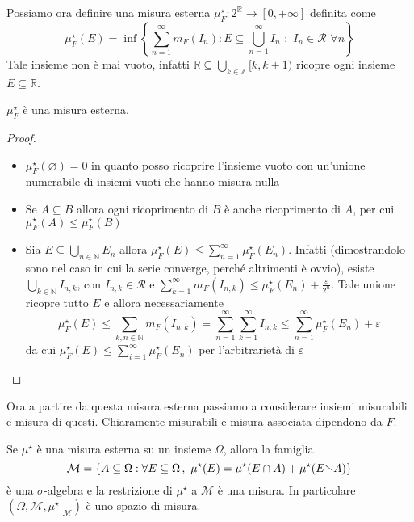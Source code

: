 Possiamo ora definire una misura esterna \(\mu^\star_F : 2^{\mathbb{R}} \to [0,
+\infty]\) definita come
\[
    \mu^\star_F{(E)} = \inf \left\{ \sum_{n=1}^{\infty} m_F{(I_{n})} : E
    \subseteq \bigcup_{n=1}^{\infty} I_{n} \,\,;\,\, I_{n} \in \mathcal{R}
\,\,\forall n \right\} 
\]
Tale insieme non è mai vuoto, infatti \(\mathbb{R} \subseteq \bigcup_{k \in
\mathbb{Z}} [k, k+1) \) ricopre ogni insieme \(E \subseteq \mathbb{R} \).
\begin{proposition}
    \(\mu^\star_F\) è una misura esterna.
\end{proposition}
\begin{proof}
\begin{itemize}[label = --]
    \item \(\mu^\star_F{(\varnothing)} = 0\) in quanto posso ricoprire l'insieme
        vuoto con un'unione numerabile di insiemi vuoti che hanno misura nulla
    \item  Se \(A \subseteq B \) allora ogni ricoprimento di \(B\) è anche
        ricoprimento di \(A\), per cui \(\mu^\star_F{(A)} \le \mu^\star_F{(B)}\)
    \item Sia \(E \subseteq \bigcup_{n \in \mathbb{N}} E_{n} \) allora
        \(\mu^\star_F{(E)} \le \sum_{n=1}^{\infty} \mu^\star_F{(E_{n})} \).
        Infatti (dimostrandolo sono nel caso in cui la serie converge, perché
        altrimenti è ovvio), esiste \(\bigcup_{k \in \mathbb{N}} I_{n, k} \),
        con \(I_{n, k}  \in \mathcal{R}\) e \(\sum_{k=1}^{\infty} m_F{(I_{n, k}
        )} \le \mu^\star_F{(E_{n})} + \frac{\varepsilon}{2^{n}}\). Tale unione
        ricopre tutto \(E\) e allora necessariamente
        \[
            \mu^\star_F{(E)} \le \sum_{k, n \in \mathbb{N}} m_F{(I_{n, k})} =
            \sum_{n=1}^{\infty} \sum_{k=1}^{\infty} I_{n, k} \le
            \sum_{n=1}^{\infty}  \mu^\star_F{(E_{n})} + \varepsilon
        \]
        da cui \(\mu^\star_F{(E)} \le \sum_{i=1}^{\infty} \mu^\star_F{(E_n)} \)
        per l'arbitrarietà di \(\varepsilon\) 
\end{itemize}
\end{proof}
Ora a partire da questa misura esterna passiamo a considerare insiemi misurabili
e misura di questi. Chiaramente misurabili e misura associata dipendono da
\(F\). 
\begin{theorem}
    Se \(\mu^\star\) è una misura esterna su un insieme \(\Omega\), allora la
    famiglia 
    \[
      \mathcal{M} = \left\{ A \subseteq \Omega : \forall E \subseteq
          \Omega\,,\,\, \mu^\star{(E)} = \mu^\star{(E \cap A)} + \mu^\star{(E
      \sminus A)} \right\}
    \]
    è una \(\sigma\)-algebra e la restrizione di \(\mu^\star\) a \(\mathcal{M}\)
    è una misura. In particolare \((\Omega, \mathcal{M},
    \mu^\star|_{\mathcal{M}} )\) è uno spazio di misura.
\end{theorem}
